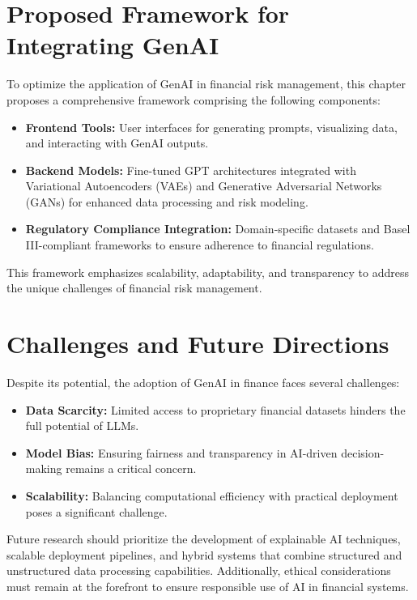 \documentclass[a4paper,headinclude=on,footinclude=on,12pt,oneside]{scrbook}
\begin{document}
\section{Proposed Framework for Integrating GenAI}

To optimize the application of GenAI in financial risk management, this chapter proposes a comprehensive framework comprising the following components:

\begin{itemize}
	\item \textbf{Frontend Tools:} User interfaces for generating prompts, visualizing data, and interacting with GenAI outputs.
	\item \textbf{Backend Models:} Fine-tuned GPT architectures integrated with Variational Autoencoders (VAEs) and Generative Adversarial Networks (GANs) for enhanced data processing and risk modeling.
	\item \textbf{Regulatory Compliance Integration:} Domain-specific datasets and Basel III-compliant frameworks to ensure adherence to financial regulations.
\end{itemize}

This framework emphasizes scalability, adaptability, and transparency to address the unique challenges of financial risk management.

\section{Challenges and Future Directions}

Despite its potential, the adoption of GenAI in finance faces several challenges:

\begin{itemize}
	\item \textbf{Data Scarcity:} Limited access to proprietary financial datasets hinders the full potential of LLMs.
	\item \textbf{Model Bias:} Ensuring fairness and transparency in AI-driven decision-making remains a critical concern.
	\item \textbf{Scalability:} Balancing computational efficiency with practical deployment poses a significant challenge.
\end{itemize}

Future research should prioritize the development of explainable AI techniques, scalable deployment pipelines, and hybrid systems that combine structured and unstructured data processing capabilities. Additionally, ethical considerations must remain at the forefront to ensure responsible use of AI in financial systems.
\end{document}
